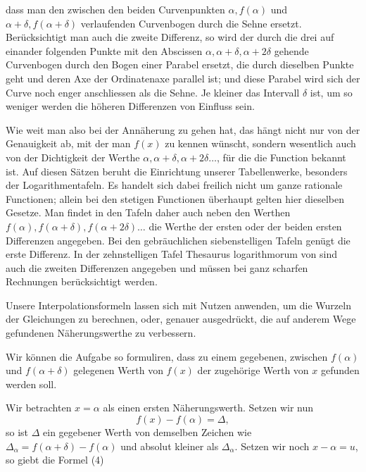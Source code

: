 dass man den zwischen den beiden Curvenpunkten $\alpha, f(\alpha)$ und
$\alpha + \delta, f(\alpha + \delta)$ verlaufenden Curvenbogen durch die Sehne
ersetzt. Berücksichtigt man auch die zweite Differenz, so wird der durch die
drei auf einander folgenden Punkte mit den Abscissen $\alpha, \alpha + \delta,
\alpha + 2\delta$ gehende Curvenbogen durch den Bogen einer Parabel ersetzt,
die durch dieselben Punkte geht und deren Axe der Ordinatenaxe parallel ist;
und diese Parabel wird sich der Curve noch enger anschliessen als die Sehne.
Je kleiner das Intervall $\delta$ ist, um so weniger werden die höheren
Differenzen von Einfluss sein.

Wie weit man also bei der Annäherung zu gehen hat, das hängt nicht nur von der
Genauigkeit ab, mit der man $f(x)$ zu kennen wünscht, sondern wesentlich auch
von der Dichtigkeit der Werthe $\alpha, \alpha + \delta, \alpha + 2\delta
\ldots$, für die die Function bekannt ist. Auf diesen Sätzen beruht die
Einrichtung unserer Tabellenwerke, besonders der Logarithmentafeln. Es
handelt sich dabei freilich nicht um ganze rationale Functionen; allein bei
den stetigen Functionen überhaupt gelten hier dieselben Gesetze. Man findet
in den Tafeln daher auch neben den Werthen $f(\alpha), f(\alpha + \delta),
f(\alpha + 2\delta) \ldots$ die Werthe der ersten oder der beiden ersten
Differenzen angegeben. Bei den gebräuchlichen siebenstelligen Tafeln genügt
die erste Differenz. In der zehnstelligen Tafel \glqq Thesaurus
logarithmorum\grqq{} von  sind auch die zweiten Differenzen
angegeben und müssen bei ganz scharfen Rechnungen berücksichtigt werden.

Unsere Interpolationsformeln lassen sich mit Nutzen anwenden, um die Wurzeln
der Gleichungen zu berechnen, oder, genauer ausgedrückt, die auf anderem
Wege gefundenen Näherungswerthe zu verbessern.

Wir können die Aufgabe so formuliren, dass zu einem gegebenen, zwischen
$f(\alpha)$ und $f(\alpha + \delta)$ gelegenen Werth von $f(x)$ der
zugehörige Werth von $x$ gefunden werden soll.

Wir betrachten $x = \alpha$ als einen ersten Näherungswerth. Setzen wir nun
\[
f(x) - f(\alpha) = \varDelta,
\]
so ist $\varDelta$ ein gegebener Werth von demselben Zeichen wie
$\varDelta_\alpha = f(\alpha + \delta) - f(\alpha)$ und absolut kleiner als
$\varDelta_\alpha$. Setzen wir noch $x - \alpha = u$, so giebt die Formel (4)

